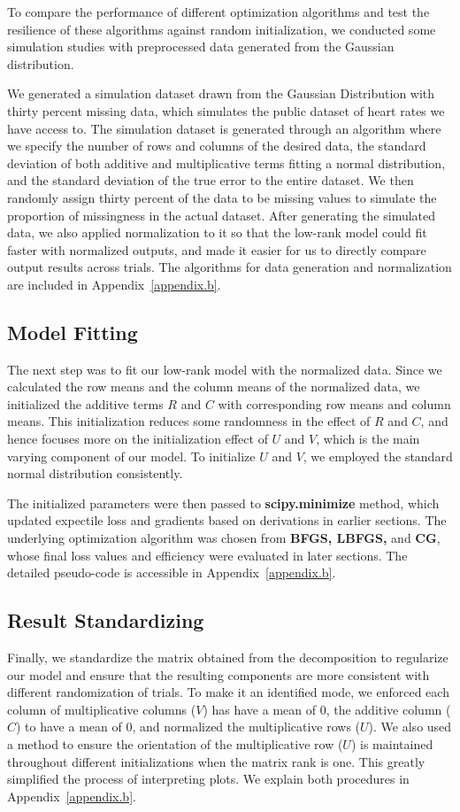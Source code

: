 \documentclass{article}
\begin{document}
To compare the performance of different optimization algorithms and test the resilience of these algorithms against random initialization, we conducted some simulation studies with preprocessed data generated from the Gaussian distribution. 

We generated a simulation dataset drawn from the Gaussian Distribution with thirty percent missing data, which simulates the public dataset of heart rates we have access to. The simulation dataset is generated through an algorithm where we specify the number of rows and columns of the desired data, the standard deviation of both additive and multiplicative terms fitting a normal distribution, and the standard deviation of the true error to the entire dataset. We then randomly assign thirty percent of the data to be missing values to simulate the proportion of missingness in the actual dataset. 
After generating the simulated data, we also applied normalization to it so that the low-rank model could fit faster with normalized outputs, and made it easier for us to directly compare output results across trials. 
The algorithms for data generation and normalization are included in Appendix~\ref{appendix.b}.

\subsection{Model Fitting}
The next step was to fit our low-rank model with the normalized data. Since we calculated the row means and the column means of the normalized data, we initialized the additive terms $R$ and $C$ with corresponding row means and column means. This initialization reduces some randomness in the effect of $R$ and $C$, and hence focuses more on the initialization effect of $U$ and $V$, which is the main varying component of our model. To initialize $U$ and $V$, we employed the standard normal distribution consistently. 

The initialized parameters were then passed to \textbf{scipy.minimize} method, which updated expectile loss and gradients based on derivations in earlier sections. The underlying optimization algorithm was chosen from \textbf{BFGS, LBFGS,} and \textbf{CG}, whose final loss values and efficiency were evaluated in later sections. The detailed pseudo-code is accessible in Appendix~\ref{appendix.b}.


\subsection{Result Standardizing}
Finally, we standardize the matrix obtained from the decomposition to regularize our model and ensure that the resulting components are more consistent with different randomization of trials. To make it an identified mode, we enforced each column of multiplicative columns ($V$) has have a mean of 0, the additive column ($C$) to have a mean of 0, and normalized the multiplicative rows ($U$). We also used a method to ensure the orientation of the multiplicative row ($U$) is maintained throughout different initializations when the matrix rank is one. This greatly simplified the process of interpreting plots. We explain both procedures in Appendix~\ref{appendix.b}.  
\end{document}
